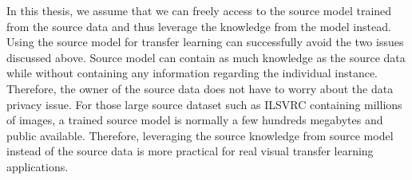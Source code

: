 In this thesis, we assume that we can freely access to the source model trained from the source data and thus leverage the knowledge from the model instead. Using the source model for transfer learning can successfully avoid the two issues discussed above. Source model can contain as much knowledge as the source data while without containing any information regarding the individual instance. Therefore, the owner of the source data does not have to worry about the data privacy issue. For those large source dataset such as ILSVRC containing millions of images, a trained source model is normally a few hundreds megabytes and public available. Therefore, leveraging the source knowledge from source model instead of the source data is more practical for real visual transfer learning applications.
